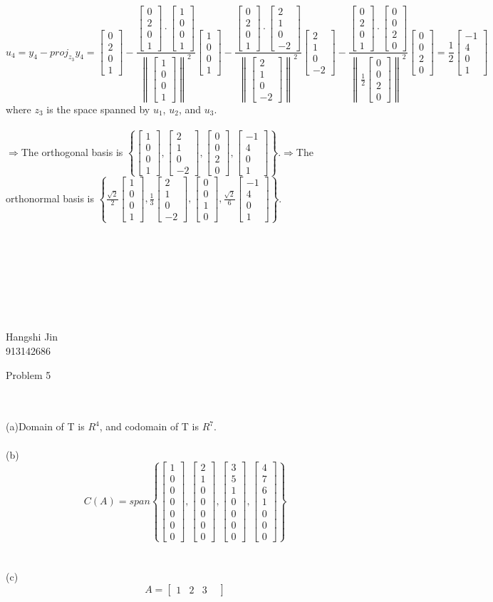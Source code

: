 \documentclass{article}
\begin{document}
\begin{equation*}u_4=y_4-proj_{z_3}y_4=\begin{bmatrix}0\\2\\0\\1\end{bmatrix}-\frac{\begin{bmatrix}0\\2\\0\\1\end{bmatrix}\cdot\begin{bmatrix}1\\0\\0\\1\end{bmatrix}}{\left\lVert\begin{bmatrix}1\\0\\0\\1\end{bmatrix}\right\rVert^2}\begin{bmatrix}1\\0\\0\\1\end{bmatrix}-\frac{\begin{bmatrix}0\\2\\0\\1\end{bmatrix}\cdot\begin{bmatrix}2\\1\\0\\-2\end{bmatrix}}{\left\lVert\begin{bmatrix}2\\1\\0\\-2\end{bmatrix}\right\rVert^2}\begin{bmatrix}2\\1\\0\\-2\end{bmatrix}-\frac{\begin{bmatrix}0\\2\\0\\1\end{bmatrix}\cdot\begin{bmatrix}0\\0\\2\\0\end{bmatrix}}{\left\lVert\frac{1}{2}\begin{bmatrix}0\\0\\2\\0\end{bmatrix}\right\rVert^2}\begin{bmatrix}0\\0\\2\\0\end{bmatrix}=\frac{1}{2}\begin{bmatrix}-1\\4\\0\\1\end{bmatrix}\end{equation*}where $z_3$ is the space spanned by $u_1$, $u_2$, and $u_3$.
\\\\$\Rightarrow$The orthogonal basis is $\left\{\begin{bmatrix}1\\0\\0\\1\end{bmatrix},\begin{bmatrix}2\\1\\0\\-2\end{bmatrix},\begin{bmatrix}0\\0\\2\\0\end{bmatrix},\begin{bmatrix}-1\\4\\0\\1\end{bmatrix}\right\}$.$\Rightarrow$The orthonormal basis is $\left\{\frac{\sqrt{2}}{2}\begin{bmatrix}1\\0\\0\\1\end{bmatrix},\frac{1}{3}\begin{bmatrix}2\\1\\0\\-2\end{bmatrix},\begin{bmatrix}0\\0\\1\\0\end{bmatrix},\frac{\sqrt{2}}{6}\begin{bmatrix}-1\\4\\0\\1\end{bmatrix}\right\}$.\\\\\\\\\\\\\\\\
\begin{flushright}Hangshi Jin\\913142686\end{flushright}
\begin{large}Problem 5\end{large}
\\\\(a)Domain of T is $R^4$, and codomain of T is $R^7$.
\\\\(b)\[C(A)=span\left\{\begin{bmatrix}1\\0\\0\\0\\0\\0\\0\end{bmatrix},\begin{bmatrix}2\\1\\0\\0\\0\\0\\0\end{bmatrix},\begin{bmatrix}3\\5\\1\\0\\0\\0\\0\end{bmatrix},\begin{bmatrix}4\\7\\6\\1\\0\\0\\0\end{bmatrix}\right\}\]
\\\\(c)\[A=\begin{bmatrix}
1 & 2 & 3 &
\end{bmatrix}\]
\end{document}
